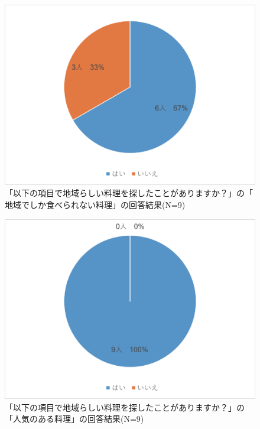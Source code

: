 \documentclass{funthesis}
\begin{document}
\begin{figure}[tbp]
  \begin{center}
    \includegraphics[clip,width=12cm]{5.6.eps}
    \caption[「以下の項目で地域らしい料理を探したことがありますか？」の「 地域でしか食べられない料理」の回答結果]{「以下の項目で地域らしい料理を探したことがありますか？」の「 地域でしか食べられない料理」の回答結果(N=9)}
  \end{center}
\end{figure}

\begin{figure}[tbp]
  \begin{center}
    \includegraphics[clip,width=12cm]{5.7.eps}
    \caption[「以下の項目で地域らしい料理を探したことがありますか？」の「人気のある料理」の回答結果]{「以下の項目で地域らしい料理を探したことがありますか？」の「人気のある料理」の回答結果(N=9)}
  \end{center}
\end{figure}
\end{document}
